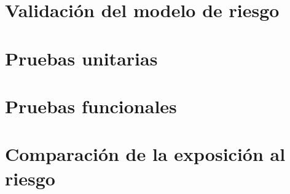 
\section{Validación del modelo de riesgo}
\label{sec:validacion_modelo_riesgo}


\section{Pruebas unitarias}
\label{sec:pruebas_unitarias}


\section{Pruebas funcionales}
\label{sec:pruebas_funcionales}


\section{Comparación de la exposición al riesgo}
\label{sec:comparacion_exposicion}


